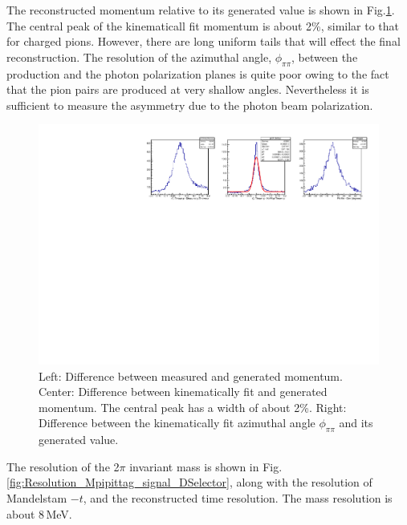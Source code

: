 The reconstructed momentum relative to its generated value is shown in
Fig.\ref{fig:DeltapDeltaPhi_signal_DSelector}. The central peak of the
kinematicall fit momentum is about 2\%, similar to that for charged
pions. However, there are long uniform tails that will effect the
final reconstruction. The resolution of the azimuthal angle,
$\phi_{\pi\pi}$, between the production and the photon polarization
planes is quite poor owing to the fact that the pion pairs are
produced at very shallow angles. Nevertheless it is sufficient to
measure the asymmetry due to the photon beam polarization.
\begin{figure}[tph]
\centering
\includegraphics[width=6in]{figures/DeltapDeltaPhi_signal_DSelector.pdf}
\caption{Left: Difference between measured and generated momentum. Center: Difference between kinematically fit and generated momentum. The central peak has a width of about 2\%. Right: Difference between the kinematically fit azimuthal angle $\phi_{\pi\pi}$ and its generated value.
\label{fig:DeltapDeltaPhi_signal_DSelector}}
\end{figure}
The resolution of the 2$\pi$ invariant mass is shown in Fig.\,\ref{fig:Resolution_Mpipittag_signal_DSelector}, along with the resolution of Mandelstam $-t$, and the reconstructed time resolution. The mass resolution is about 8\,MeV.
